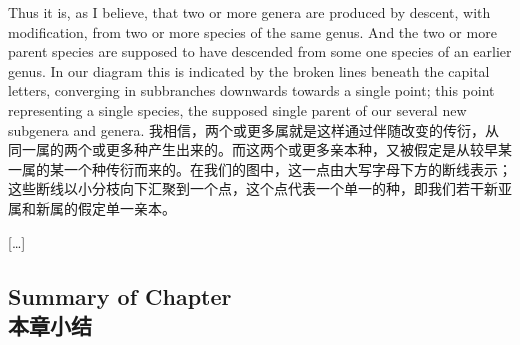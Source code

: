 \darwinpair
{Thus it is, as I believe, that two or more genera are produced by descent, with modification, from two or more species of the same genus. And the two or more parent species are supposed to have descended from some one species of an earlier genus. In our diagram this is indicated by the broken lines beneath the capital letters, converging in subbranches downwards towards a single point; this point representing a single species, the supposed single parent of our several new subgenera and genera.}
{我相信，两个或更多属就是这样通过伴随改变的传衍，从同一属的两个或更多种产生出来的。而这两个或更多亲本种，又被假定是从较早某一属的某一个种传衍而来的。在我们的图中，这一点由大写字母下方的断线表示；这些断线以小分枝向下汇聚到一个点，这个点代表一个单一的种，即我们若干新亚属和新属的假定单一亲本。}

\begin{center}
[\ldots]
\end{center}

\subsection*{Summary of Chapter\\本章小结}

